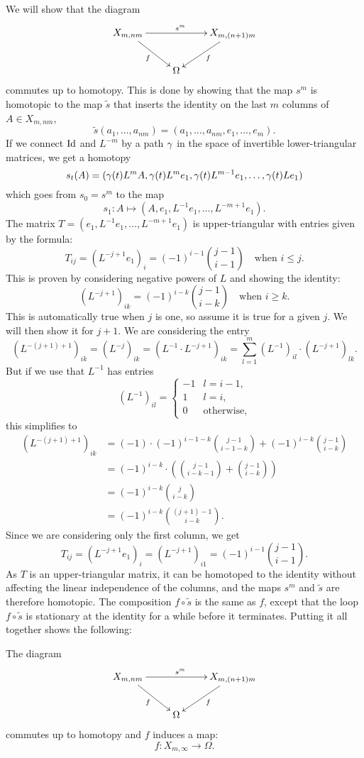 We will show that the diagram
\[ \xymatrix{ X_{m,nm} \ar[rr]^{s^m}\ar[dr]_f & & X_{m,(n+1)m}
  \ar[dl]^f \\
  & \Omega & } \]
commutes up to homotopy. This is done by showing that the map $s^m$ is
homotopic to the map $\widetilde s$ that inserts the identity on the
last $m$ columns of $A \in X_{m,nm}$,
\[ \widetilde s (a_1,\dots,a_{nm}) =
(a_1,\dots,a_{nm},e_1,\dots,e_m). \]
If we connect $\operatorname{Id}$ and $L^{-m}$ by a path $\gamma$ in the space of
invertible lower-triangular matrices, we get a homotopy
\[ s_t(A) = (\gamma(t)L^mA,
\gamma(t)L^me_1,\gamma(t)L^{m-1}e_1,\dots,\gamma(t)Le_1) \]
which goes from $s_0 = s^m$ to the map
\[ s_1 : A \mapsto (A,e_1,L^{-1}e_1,\dots,L^{-m+1}e_1). \]
The matrix $T = (e_1,L^{-1}e_1,\dots,L^{-m+1}e_1)$ is upper-triangular
with entries given by the formula:
\[ T_{ij} = (L^{-j+1}e_1)_i = (-1)^{i-1}\binom{j-1}{i-1} \quad
\text{when } i \leq j. \]
This is proven by considering negative powers of $L$ and showing the
identity:
\[ (L^{-j+1})_{ik} = (-1)^{i-k}\binom{j-1}{i-k} \quad \text{when } i
\geq k. \] 
This is automatically true when $j$ is one, so assume it is true for
a given $j$. We will then show it for $j+1$. We are considering the
entry
\[ (L^{-(j+1)+1})_{ik} = (L^{-j})_{ik} = (L^{-1}\cdot L^{-j+1})_{ik} =
\sum_{l=1}^m (L^{-1})_{il} \cdot (L^{-j+1})_{lk}. \]
But if we use that $L^{-1}$ has entries
\[ (L^{-1})_{il} =
\begin{cases}
  -1 & l = i-1, \\
  1 & l = i,  \\
  0 & \text{otherwise},
\end{cases} \]
this simplifies to
\begin{align*}
  (L^{-(j+1)+1})_{ik} &= (-1)\cdot(-1)^{i-1-k}\binom{j-1}{i-1-k}
                        + (-1)^{i-k}\binom{j-1}{i-k} \\
                      &= (-1)^{i-k}\cdot \left( \binom{j-1}{i-k-1} +
                        \binom{j-1}{i-k} \right)\\
                      &= (-1)^{i-k} \binom{j}{i-k} \\
                      &= (-1)^{i-k} \binom{(j+1)-1}{i-k}.
\end{align*}
Since we are considering only the first column, we get
\[ T_{ij} = (L^{-j+1}e_1)_i = (L^{-j+1})_{i1} =
(-1)^{i-1}\binom{j-1}{i-1}. \]
As $T$ is an upper-triangular matrix, it can be homotoped to
the identity without affecting the linear independence of the
columns, and the maps $s^m$ and $\widetilde s$ are therefore
homotopic. The composition
$f\circ \widetilde s$ is the same as $f$, except that the loop
$f\circ\widetilde s$ is stationary at the identity for a while before
it terminates. Putting it all together shows the following:
\begin{lemma}
  \label{lem:homotopycommute}
  The diagram
  \[ \xymatrix{ X_{m,nm} \ar[rr]^{s^m}\ar[dr]_{f} & & \ar[dl]^f
    X_{m,(n+1)m} \\
    & \Omega & } \]
  commutes up to homotopy and $f$ induces a map:
  \[ f : X_{m,\infty} \to \Omega. \]
\end{lemma}

